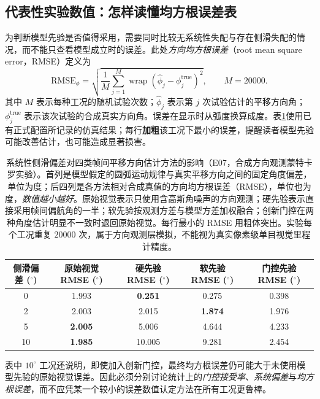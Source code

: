 \documentclass[UTF8,a4paper,fontset=fandol,11pt]{ctexart}
\begin{document}
\subsection{代表性实验数值：怎样读懂均方根误差表}
为判断模型先验是否值得采用，需要同时比较无系统性失配与存在侧滑失配的情况，而不能只查看模型成立时的误差。此处\emph{方向均方根误差}（root mean square error，RMSE）定义为
\begin{equation}
 \mathrm{RMSE}_{\phi}
 =\sqrt{\frac{1}{M}\sum_{j=1}^{M}
  \operatorname{wrap}\!\left(\hat\phi_j-\phi_j^{\mathrm{true}}\right)^2},
 \qquad M=20000.
\end{equation}
其中 $M$ 表示每种工况的随机试验次数；$\hat\phi_j$ 表示第 $j$ 次试验估计的平移方向角；$\phi_j^{\mathrm{true}}$ 表示该次试验的合成真实方向角。误差在显示时从弧度换算成度。表\ref{tab:mcresults}使用已有正式配置所记录的仿真结果；每行\textbf{加粗}该工况下最小的误差，提醒读者模型先验可能改善估计，也可能造成显著损害。

\begin{table}[htbp]
\centering\small
\caption{系统性侧滑偏差对四类帧间平移方向估计方法的影响（E07，合成方向观测蒙特卡罗实验）。首列是模型假定的圆弧运动规律与真实平移方向之间的固定角度偏差，单位为度；后四列是各方法相对合成真值的方向均方根误差（RMSE），单位也为度，\emph{数值越小越好}。原始视觉表示只使用含高斯角噪声的方向观测；硬先验表示直接采用帧间偏航角的一半；软先验按观测方差与模型方差加权融合；创新门控在两种角度估计明显不一致时退回原始视觉。每行最小的 RMSE 用粗体突出。实验每个工况重复 $20000$ 次，属于方向观测层模拟，不能视为真实像素级单目视觉里程计精度。}
\label{tab:mcresults}
\begin{tabular}{ccccc}
\toprule
侧滑偏差 ($^\circ$)& 原始视觉 RMSE ($^\circ$)& 硬先验 RMSE ($^\circ$)&软先验 RMSE ($^\circ$)& 门控先验 RMSE ($^\circ$)\\
\midrule
0  &1.993&\textbf{0.251}&0.275&0.398\\
2  &2.003&2.015&\textbf{1.874}&1.976\\
5  &\textbf{2.005}&5.006&4.644&4.233\\
10 &\textbf{1.985}&10.005&9.281&2.454\\
\bottomrule
\end{tabular}
\end{table}

表中 $10^\circ$ 工况还说明，即使加入创新门控，最终均方根误差仍可能大于未使用模型先验的原始视觉误差。因此必须分别讨论统计上的\emph{门控接受率}、\emph{系统偏差}与\emph{均方根误差}，而不应凭某一个较小的误差数值认定方法在所有工况更鲁棒。
\end{document}
